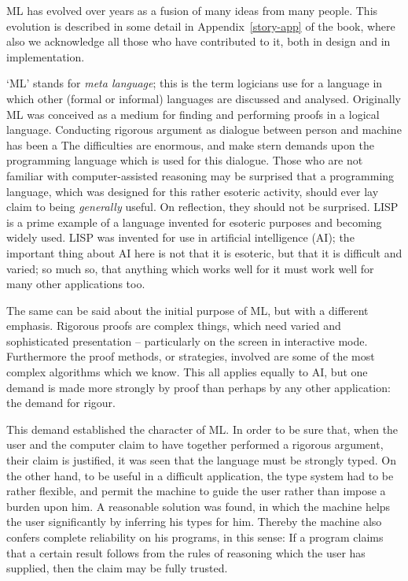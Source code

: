 ML has evolved over  years as a fusion of many ideas 
from many people. This evolution is
described in some detail in Appendix~\ref{story-app} of the book, where also we
acknowledge all those who have contributed to it, both in design
and in implementation.

`ML' stands for 
{\sl meta language}; this is the term logicians use for a language in which
other (formal or informal) languages are discussed and analysed.  
Originally ML was conceived as a medium for finding and performing 
proofs in a logical language.   Conducting rigorous argument as dialogue 
between person and machine has been a  The difficulties are enormous, 
and make stern demands
upon the programming language which is used for this dialogue.   Those who are
not familiar with computer-assisted reasoning may be surprised that a 
programming language, which was designed for this rather esoteric activity, 
should ever lay claim to being {\sl generally} useful.
On reflection, they should not be surprised.  LISP is a prime example of
a language invented for esoteric purposes and becoming widely used.  LISP
was invented for use in artificial intelligence (AI); the important thing
about AI here is not that it is esoteric,  but that
it is difficult and varied; so much so, that anything which works well for
it must work well for many other applications too.

The same can be said about the initial purpose of ML, but with a different
emphasis.  Rigorous proofs are complex things, which need varied
and sophisticated presentation -- particularly on the screen in interactive
mode. Furthermore the proof methods, or
strategies, involved are some of the most complex algorithms which we know.   
This all applies equally to AI, but one demand is made more strongly 
by proof than perhaps by any other application: the demand for rigour.  

This demand established the character of ML.  In order to be sure that,
when the user and the computer claim to have together performed a rigorous
argument, their claim is justified, it was seen 
that the language must be strongly typed. On the other hand, to be
useful in a difficult  application, the type system had to be rather
flexible, and permit the machine to guide the user rather than impose
a burden upon him.   A reasonable solution was found, in which the machine
helps the user significantly  by
inferring his types for him. Thereby the machine also confers complete
reliability on his programs, in this sense: 
If a program claims that a certain result 
follows from the rules of reasoning which the user has supplied, then the 
claim may be fully trusted.


